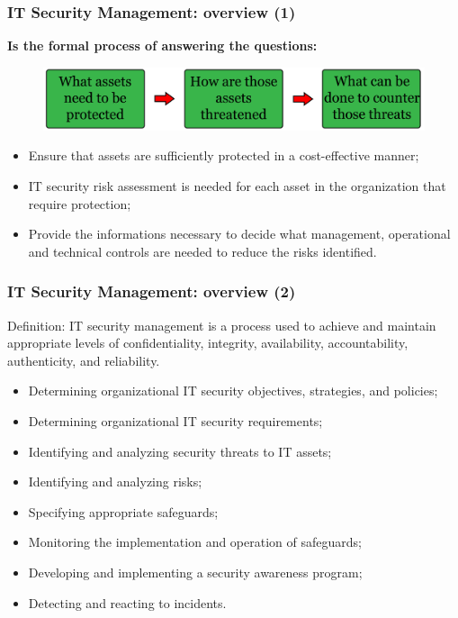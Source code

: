 \documentclass[xcolor ={table,usenames,dvipsnames}]{beamer}
\theoremstyle{definition}
\begin{document}
	
	\begin{frame}
		\frametitle{IT Security Management: overview (1)}
	\textbf{	Is the formal process of answering the questions:}
		\begin{figure}[h!]
			\centering
			\includegraphics[scale=0.20]{img/img_01.PNG}
			\label{Interfacce di un CS}
		\end{figure}
		\begin{itemize}
			\item Ensure that assets are sufficiently protected in a cost-effective manner;
			\item IT security risk assessment is needed for each asset in the organization that require protection;
			\item Provide the informations necessary to decide what management, operational and technical controls are needed to reduce the risks identified.
		\end{itemize}
	\end{frame}

	\begin{frame}
		\frametitle{IT Security Management: overview (2)}
		\begin{alertblock}{Definition:}
			 IT security management is a process used to achieve and maintain appropriate levels of confidentiality, integrity, availability, accountability, authenticity, and reliability. 
		\end{alertblock}
		\begin{itemize}
			\item Determining organizational IT security objectives, strategies, and policies;
			\item Determining organizational IT security requirements;
			\item Identifying and analyzing security threats to IT assets; 
			\item Identifying and analyzing risks;
			\item Specifying appropriate safeguards;
			\item Monitoring the implementation and operation of safeguards;
			\item Developing and implementing a security awareness program;
			\item Detecting and reacting to incidents.
		\end{itemize}	
	\end{frame}
\end{document}
